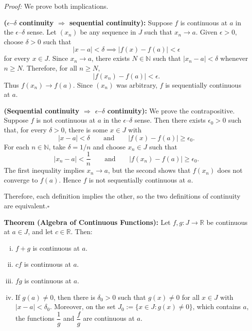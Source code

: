 \documentclass[a4paper,11pt,abstracton]{scrartcl}
\newcommand{\RR}{\mathbb{R}}
\newcommand{\NN}{\mathbb{N}}
\theoremstyle{dotlessP}
\theoremstyle{dotlessS}
\theoremstyle{remark}
\theoremstyle{definition}
\begin{document}
\begin{claim_box}
\textit{Proof:}
We prove both implications.

\textbf{($\epsilon$--$\delta$ continuity $\Rightarrow$ sequential continuity):}
Suppose $f$ is continuous at $a$ in the $\epsilon$--$\delta$ sense. Let $(x_n)$ be any sequence in $J$ such that $x_n\to a$. Given $\epsilon>0$, choose $\delta>0$ such that
\[
    |x-a|<\delta\implies |f(x)-f(a)|<\epsilon
\]
for every $x\in J$. Since $x_n\to a$, there exists $N\in\NN$ such that $|x_n-a|<\delta$ whenever $n\ge N$. Therefore, for all $n\ge N$,
\[
    |f(x_n)-f(a)|<\epsilon.
\]
Thus $f(x_n)\to f(a)$. Since $(x_n)$ was arbitrary, $f$ is sequentially continuous at $a$.

\medskip
\textbf{(Sequential continuity $\Rightarrow$ $\epsilon$--$\delta$ continuity):}
We prove the contrapositive. Suppose $f$ is not continuous at $a$ in the $\epsilon$--$\delta$ sense. Then there exists $\epsilon_0>0$ such that, for every $\delta>0$, there is some $x\in J$ with
\[
    |x-a|<\delta\qquad\text{and}\qquad |f(x)-f(a)|\ge\epsilon_0.
\]
For each $n\in\NN$, take $\delta=1/n$ and choose $x_n\in J$ such that
\[
    |x_n-a|<\frac1n\qquad\text{and}\qquad |f(x_n)-f(a)|\ge\epsilon_0.
\]
The first inequality implies $x_n\to a$, but the second shows that $f(x_n)$ does not converge to $f(a)$. Hence $f$ is not sequentially continuous at $a$.

Therefore, each definition implies the other, so the two definitions of continuity are equivalent.\hfill$\square$
\end{claim_box}

\begin{problem_box}
\textbf{Theorem (Algebra of Continuous Functions):}
Let $f,g:J\rightarrow\RR$ be continuous at $a\in J$, and let $c\in\RR$. Then:
\begin{enumerate}[(i)]
    \item $f+g$ is continuous at $a$.
    \item $cf$ is continuous at $a$.
    \item $fg$ is continuous at $a$.
    \item If $g(a)\ne0$, then there is $\delta_0>0$ such that $g(x)\ne0$ for all $x\in J$ with $|x-a|<\delta_0$. Moreover, on the set $J_0:=\{x\in J:g(x)\ne0\}$, which contains $a$, the functions $\dfrac1g$ and $\dfrac fg$ are continuous at $a$.
\end{enumerate}
\end{problem_box}
\end{document}
